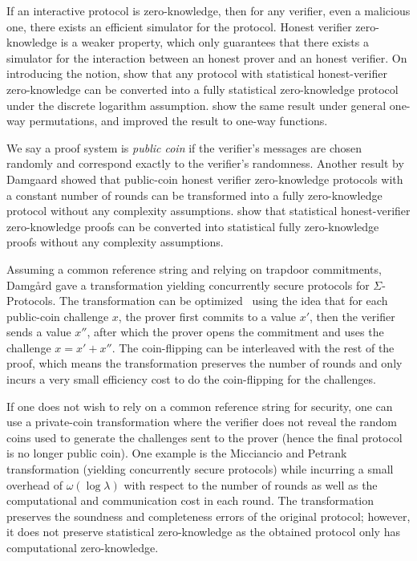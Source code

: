 If an interactive protocol is zero-knowledge, then for any verifier, even a malicious one, there exists an efficient simulator for the protocol. Honest verifier zero-knowledge \cite{BellareMO90a} is a weaker property, which only guarantees that there exists a simulator for the interaction between an honest prover and an honest verifier. On introducing the notion, \cite{BellareMO90a} show that any protocol with statistical honest-verifier zero-knowledge can be converted into a fully statistical zero-knowledge protocol under the discrete logarithm assumption. \cite{OstrovskyVY93} show the same result under general one-way permutations, and \cite{Okamoto00} improved the result to one-way functions.

We say a proof system is \emph{public coin} if the verifier's messages are chosen randomly and correspond exactly to the verifier's randomness. Another result by Damgaard \cite{Damgard93} showed that public-coin honest verifier zero-knowledge protocols with a constant number of rounds can be transformed into a fully zero-knowledge protocol without any complexity assumptions. \cite{GoldreichSV98} show that statistical honest-verifier zero-knowledge proofs can be converted into statistical fully zero-knowledge proofs without any complexity assumptions.

Assuming a common reference string and relying on trapdoor commitments, Damg{\aa}rd \cite{Damgard2000} gave a transformation yielding concurrently secure protocols for $\Sigma$-Protocols. The transformation can be optimized~\cite{dissertation} using the idea that for each public-coin challenge $x$, the prover first commits to a value $x'$, then the verifier sends a value $x''$, after which the prover opens the commitment and uses the challenge $x=x'+x''$. The coin-flipping can be interleaved with the rest of the proof, which means the transformation preserves the number of rounds and only incurs a very small efficiency cost to do the coin-flipping for the challenges. 

If one does not wish to rely on a common reference string for security, one can use a private-coin transformation where the verifier
does not reveal the random coins used to generate the challenges sent to the prover (hence the final protocol is no longer public coin).
One example is the Micciancio and Petrank \cite{MP03} transformation (yielding concurrently secure protocols) while incurring a small overhead of $\omega(\log{\lambda})$ with respect to the number of rounds as well as the computational and communication cost in each round. %
The transformation preserves the soundness and completeness errors of the original protocol; however, it does not preserve statistical zero-knowledge as the obtained protocol only has computational zero-knowledge. 

